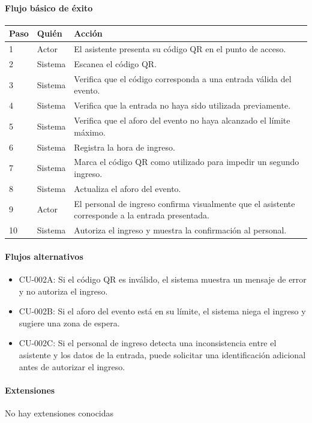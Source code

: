 \paragraph{Flujo básico de éxito}
\begin{longtable}{P{1.1cm}P{1.8cm}P{10.5cm}}
\toprule
\textbf{Paso} & \textbf{Quién} & \textbf{Acción}\\
\midrule
{} & Actor & El asistente presenta su código QR en el punto de acceso.\\
2 & Sistema & Escanea el código QR.\\
3 & Sistema & Verifica que el código corresponda a una entrada válida del evento.\\
4 & Sistema & Verifica que la entrada no haya sido utilizada previamente.\\
5 & Sistema & Verifica que el aforo del evento no haya alcanzado el límite máximo.\\
6 & Sistema & Registra la hora de ingreso.\\
7 & Sistema & Marca el código QR como utilizado para impedir un segundo ingreso.\\
8 & Sistema & Actualiza el aforo del evento.\\
9 & Actor & El personal de ingreso confirma visualmente que el asistente corresponde a la entrada presentada.\\
10 & Sistema & Autoriza el ingreso y muestra la confirmación al personal.\\
\bottomrule
\end{longtable}

\paragraph{Flujos alternativos}
\begin{itemize}[leftmargin=1.4em, topsep=1pt]
  \item CU-002A: Si el código QR es inválido, el sistema muestra un mensaje de error y no autoriza el ingreso.
  \item CU-002B: Si el aforo del evento está en su límite, el sistema niega el ingreso y sugiere una zona de espera.
  \item CU-002C: Si el personal de ingreso detecta una inconsistencia entre el asistente y los datos de la entrada, puede solicitar una identificación adicional antes de autorizar el ingreso.
\end{itemize}

\paragraph{Extensiones}
No hay extensiones conocidas

